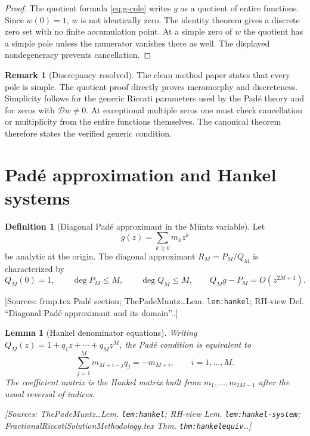 \documentclass[11pt]{article}
\newtheorem{lemma}[theorem]{Lemma}
\theoremstyle{definition}
\newtheorem{definition}[theorem]{Definition}
\newtheorem{remark}[theorem]{Remark}
\newcommand{\Dc}{\mathcal{D}}
\newcommand{\Source}[1]{\par\smallskip\noindent\textup{[Sources: #1.]}}
\begin{document}
\begin{proof}
The quotient formula \eqref{eq:g-cole} writes $g$ as a quotient of entire functions.
Since $w(0)=1$,
$w$ is not identically zero.
The identity theorem gives a discrete zero set with no finite accumulation point.
At a simple zero of $w$ the quotient has a simple pole unless the numerator vanishes there as well.
The displayed nondegeneracy prevents cancellation.
\end{proof}

\begin{remark}[Discrepancy resolved]
The clean method paper states that every pole is simple.
The quotient proof directly proves meromorphy and discreteness.
Simplicity follows for the generic Riccati parameters used by the Padé theory and for zeros with $\Dc w\ne0$.
At exceptional multiple zeros one must check cancellation or multiplicity from the entire functions themselves.
The canonical theorem therefore states the verified generic condition.
\end{remark}

\section{Padé approximation and Hankel systems}

\begin{definition}[Diagonal Padé approximant in the Müntz variable]\label{def:pade}
Let
\[
        g(z)=\sum_{k\ge0}m_kz^k
\]
be analytic at the origin.
The diagonal approximant $R_M=P_M/Q_M$ is characterized by
\begin{equation}\label{eq:pade-condition}
        Q_M(0)=1,
        \qquad
        \deg P_M\le M,
        \qquad
        \deg Q_M\le M,
        \qquad
        Q_Mg-P_M=O(z^{2M+1}).
\end{equation}
\Source{frmp.tex Padé section; ThePadeMuntz\ldots Lem. \texttt{lem:hankel}; RH-view Def. ``Diagonal Padé approximant and its domain''.}
\end{definition}

\begin{lemma}[Hankel denominator equations]\label{lem:hankel-denominator}
Writing $Q_M(z)=1+q_1z+\cdots+q_Mz^M$,
the Padé condition is equivalent to
\begin{equation}\label{eq:hankel-system}
        \sum_{j=1}^{M}m_{M+i-j}q_j=-m_{M+i},
        \qquad i=1,\ldots,M.
\end{equation}
The coefficient matrix is the Hankel matrix built from $m_1,\ldots,m_{2M-1}$ after the usual reversal of indices.
\Source{ThePadeMuntz\ldots Lem. \texttt{lem:hankel}; RH-view Lem. \texttt{lem:hankel-system}; FractionalRiccatiSolutionMethodology.tex Thm. \texttt{thm:hankelequiv}.}
\end{lemma}
\end{document}
